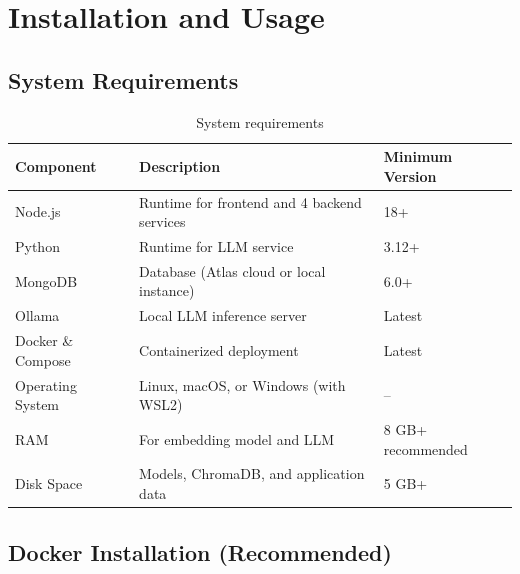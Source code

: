 \documentclass[a4paper,12pt]{report}
\begin{document}
\chapter{Installation and Usage}

\section{System Requirements}

\begin{table}[H]
\centering
\begin{tabularx}{\textwidth}{lXl}
    \toprule
    \textbf{Component} & \textbf{Description} & \textbf{Minimum Version} \\
    \midrule
    Node.js & Runtime for frontend and 4 backend services & 18+ \\
    Python & Runtime for LLM service & 3.12+ \\
    MongoDB & Database (Atlas cloud or local instance) & 6.0+ \\
    Ollama & Local LLM inference server & Latest \\
    Docker \& Compose & Containerized deployment & Latest \\
    Operating System & Linux, macOS, or Windows (with WSL2) & -- \\
    RAM & For embedding model and LLM & 8 GB+ recommended \\
    Disk Space & Models, ChromaDB, and application data & 5 GB+ \\
    \bottomrule
\end{tabularx}
\caption{System requirements}
\label{tab:sysreq}
\end{table}

\section{Docker Installation (Recommended)}
\end{document}
